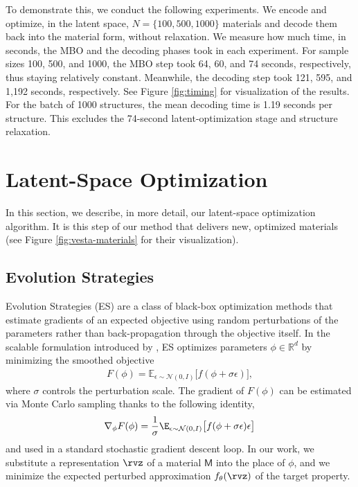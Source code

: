 \documentclass{article}
\theoremstyle{plain}
\theoremstyle{definition}
\theoremstyle{remark}
\begin{document}
To demonstrate this, we conduct the following experiments. We encode and optimize, in the latent space, $N=\{100, 500, 1000\}$ materials and decode them back into the material form, without relaxation. 
We measure how much time, in seconds, the MBO and the decoding phases took in each experiment. 
For sample sizes 100, 500, and 1000, the MBO step took 64, 60, and 74 seconds, respectively, thus staying relatively constant.
Meanwhile, the decoding step took 121, 595, and 1,192 seconds, respectively.
See Figure \ref{fig:timing} for visualization of the results.
For the batch of 1000 structures, the mean decoding time is 1.19 seconds per structure. This excludes the 74-second latent-optimization stage and structure relaxation. 

\section{Latent-Space Optimization}
In this section, we describe, in more detail, our latent-space optimization algorithm. 
It is this step of our method that delivers new, optimized materials (see Figure \ref{fig:vesta-materials} for their visualization).
\label{appendix:latent}


\subsection{Evolution Strategies}
\label{app:es}
Evolution Strategies (ES) are a class of black-box optimization methods that estimate gradients of an expected objective using random perturbations of the parameters rather than back-propagation through the objective itself. In the scalable formulation introduced by \citet{salimans2017evolution}, ES optimizes parameters $\phi \in \mathbb{R}^d$ by minimizing the smoothed objective
\begin{align}
    \label{eq:es-og}
    F(\phi) = \mathbb{E}_{\epsilon \sim \mathcal{N}(0, I)} \big[ f(\phi + \sigma \epsilon) \big], 
\end{align}
where $\sigma$ controls the perturbation scale. The gradient of $F(\phi)$ can be estimated via Monte Carlo sampling thanks to the following identity,
\begin{align}
    \nabla_{\phi}F(\phi) = \frac{1}{\sigma}\E_{\epsilon \sim \mathcal{N}(0, I)}\big[f(\phi + \sigma \epsilon)\epsilon\big]\nonumber
\end{align}
and used in a standard stochastic gradient descent loop.
In our work, we substitute a representation $\rvz$ of a material $\mathsf{M}$ into the place of $\phi$, and we minimize the expected perturbed approximation $f_{\theta}(\rvz)$ of the target property. 
\end{document}
